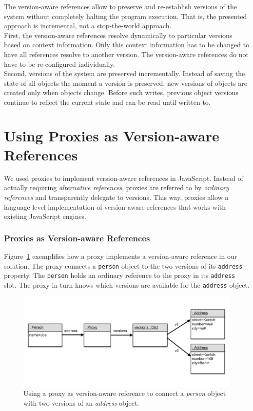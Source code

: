 The version-aware references allow to preserve and re-establish versions of the system without completely halting the program execution.
That is, the presented approach is incremental, not a stop-the-world approach.\\
First, the version-aware references resolve dynamically to particular versions based on context information.
Only this context information has to be changed to have all references resolve to another version.
The version-aware references do not have to be re-configured individually.\\
Second, versions of the system are preserved incrementally.
Instead of saving the state of all objects the moment a version is preserved, new versions of objects are created only when objects change.
Before such writes, previous object versions continue to reflect the current state and can be read until written to.


\section{Using Proxies as Version-aware References} \label{sec:APPROACH:2}

We used proxies to implement version-aware references in JavaScript.
Instead of actually requiring \emph{alternative references}, proxies are referred to by \emph{ordinary references} and transparently delegate to versions. 
This way, proxies allow a language-level implementation of version-aware references that works with existing JavaScript engines.

\subsubsection{Proxies as Version-aware References}

Figure~\ref{fig:ProxyBasedVersionAwareReference} exemplifies how a proxy implements a version-aware reference in our solution.
The proxy connects a \lstinline{person} object to the two versions of its \lstinline{address} property.
The \lstinline{person} holds an ordinary reference to the proxy in its \lstinline{address} slot.
The proxy in turn knows which versions are available for the \lstinline{address} object.

\begin{figure}[h]
    \centering
    \includegraphics[width=\textwidth]{figures/4_approach/7_proxyBasedVersionAwareReference.pdf}
    \caption{Using a proxy as version-aware reference to connect a \emph{person} object with two versions of an \emph{address} object.}
    \label{fig:ProxyBasedVersionAwareReference}
\end{figure}

